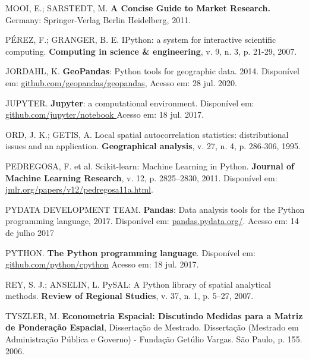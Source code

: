 \documentclass[12pt, a4paper,brazil,oneside]{article}
\begin{document}
\begin{thebibliography}{99}
		{MOOI, E.; SARSTEDT, M. \textbf{A Concise Guide to Market Research.} Germany: Springer-Verlag Berlin Heidelberg, 2011.}
		
		{PÉREZ, F.; GRANGER, B. E. IPython: a system for interactive scientific computing. \textbf{Computing in science \& engineering}, v. 9, n. 3, p. 21-29, 2007.}
		
		{JORDAHL, K. \textbf{GeoPandas}: Python tools for geographic data. 2014. Disponível em: \url{github.com/geopandas/geopandas}, Acesso em: 28 jul. 2020.}
		
		{JUPYTER. \textbf{Jupyter}: a computational environment. Disponível em: \url{github.com/jupyter/notebook } Acesso em: 18 jul. 2017.} 
		
		{ORD, J. K.; GETIS, A. Local spatial autocorrelation statistics: distributional issues and an application. \textbf{Geographical analysis}, v. 27, n. 4, p. 286-306, 1995.}
		
		{PEDREGOSA, F. et al. Scikit-learn: Machine Learning in Python. \textbf{Journal of Machine Learning Research}, v. 12, p. 2825–2830, 2011. Disponível em: \url{jmlr.org/papers/v12/pedregosa11a.html}.}
		
		{PYDATA DEVELOPMENT TEAM. \textbf{Pandas}: Data analysis tools for the Python programming language, 2017. Disponível em: \url{pandas.pydata.org/}. Acesso em: 14 de julho 2017}
		
		{PYTHON. \textbf{The Python programming language}. Disponível em: \url{github.com/python/cpython}  Acesso em: 18 jul. 2017.}
		
		{REY, S. J.; ANSELIN, L. PySAL: A Python library of spatial analytical methods.\textbf{ Review of Regional Studies}, v. 37, n. 1, p. 5–27, 2007.}
		
		{TYSZLER, M. \textbf{Econometria Espacial: Discutindo Medidas para a Matriz de Ponderação Espacial}, Dissertação de Mestrado. Dissertação (Mestrado em Administração Pública e Governo) - Fundação Getúlio Vargas. São Paulo, p. 155. 2006.}
		

\end{thebibliography}
\end{document}
